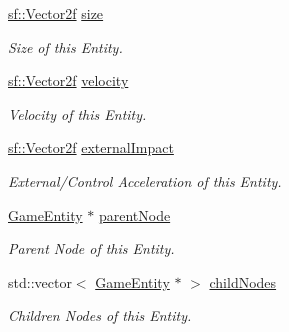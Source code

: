 \begin{DoxyCompactItemize}
\mbox{\label{class_game_entity_a0f3826c82648fed85ee93c47e9966507}} 
\mbox{\hyperlink{classsf_1_1_vector2}{sf\+::\+Vector2f}} \mbox{\hyperlink{class_game_entity_a0f3826c82648fed85ee93c47e9966507}{size}}
\begin{DoxyCompactList}\small\item\em Size of this Entity. \end{DoxyCompactList}\item 
\mbox{\label{class_game_entity_acb335d8ed77731bd621e34682abcf072}} 
\mbox{\hyperlink{classsf_1_1_vector2}{sf\+::\+Vector2f}} \mbox{\hyperlink{class_game_entity_acb335d8ed77731bd621e34682abcf072}{velocity}}
\begin{DoxyCompactList}\small\item\em Velocity of this Entity. \end{DoxyCompactList}\item 
\mbox{\label{class_game_entity_a9fc98e835d4e26f31232337bb91ea9cf}} 
\mbox{\hyperlink{classsf_1_1_vector2}{sf\+::\+Vector2f}} \mbox{\hyperlink{class_game_entity_a9fc98e835d4e26f31232337bb91ea9cf}{external\+Impact}}
\begin{DoxyCompactList}\small\item\em External/\+Control Acceleration of this Entity. \end{DoxyCompactList}\item 
\mbox{\label{class_game_entity_a558431eb4032ecef0dc6a7b216502391}} 
\mbox{\hyperlink{class_game_entity}{Game\+Entity}} $\ast$ \mbox{\hyperlink{class_game_entity_a558431eb4032ecef0dc6a7b216502391}{parent\+Node}}
\begin{DoxyCompactList}\small\item\em Parent Node of this Entity. \end{DoxyCompactList}\item 
\mbox{\label{class_game_entity_ac2710a3a520966faccf8976c299391d0}} 
std\+::vector$<$ \mbox{\hyperlink{class_game_entity}{Game\+Entity}} $\ast$ $>$ \mbox{\hyperlink{class_game_entity_ac2710a3a520966faccf8976c299391d0}{child\+Nodes}}
\begin{DoxyCompactList}\small\item\em Children Nodes of this Entity. \end{DoxyCompactList}\end{DoxyCompactItemize}


